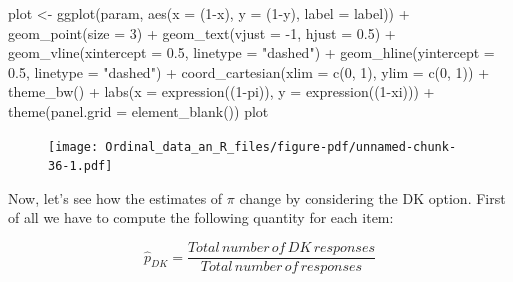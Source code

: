 \documentclass[
  letterpaper,
  DIV=11,
  numbers=noendperiod]{scrartcl}
\newenvironment{Shaded}{\begin{snugshade}}{\end{snugshade}}
\newcommand{\AttributeTok}[1]{\textcolor[rgb]{0.40,0.45,0.13}{#1}}
\newcommand{\DecValTok}[1]{\textcolor[rgb]{0.68,0.00,0.00}{#1}}
\newcommand{\FloatTok}[1]{\textcolor[rgb]{0.68,0.00,0.00}{#1}}
\newcommand{\FunctionTok}[1]{\textcolor[rgb]{0.28,0.35,0.67}{#1}}
\newcommand{\NormalTok}[1]{\textcolor[rgb]{0.00,0.23,0.31}{#1}}
\newcommand{\OtherTok}[1]{\textcolor[rgb]{0.00,0.23,0.31}{#1}}
\newcommand{\SpecialCharTok}[1]{\textcolor[rgb]{0.37,0.37,0.37}{#1}}
\newcommand{\StringTok}[1]{\textcolor[rgb]{0.13,0.47,0.30}{#1}}
\begin{document}
\begin{Shaded}
\begin{Highlighting}[]
\NormalTok{plot }\OtherTok{\textless{}{-}} \FunctionTok{ggplot}\NormalTok{(param, }\FunctionTok{aes}\NormalTok{(}\AttributeTok{x =}\NormalTok{ (}\DecValTok{1}\SpecialCharTok{{-}}\NormalTok{x), }\AttributeTok{y =}\NormalTok{ (}\DecValTok{1}\SpecialCharTok{{-}}\NormalTok{y), }\AttributeTok{label =}\NormalTok{ label)) }\SpecialCharTok{+}
  \FunctionTok{geom\_point}\NormalTok{(}\AttributeTok{size =} \DecValTok{3}\NormalTok{) }\SpecialCharTok{+}
  \FunctionTok{geom\_text}\NormalTok{(}\AttributeTok{vjust =} \SpecialCharTok{{-}}\DecValTok{1}\NormalTok{, }\AttributeTok{hjust =} \FloatTok{0.5}\NormalTok{) }\SpecialCharTok{+}
  \FunctionTok{geom\_vline}\NormalTok{(}\AttributeTok{xintercept =} \FloatTok{0.5}\NormalTok{, }\AttributeTok{linetype =} \StringTok{"dashed"}\NormalTok{) }\SpecialCharTok{+}
  \FunctionTok{geom\_hline}\NormalTok{(}\AttributeTok{yintercept =} \FloatTok{0.5}\NormalTok{, }\AttributeTok{linetype =} \StringTok{"dashed"}\NormalTok{) }\SpecialCharTok{+}
  \FunctionTok{coord\_cartesian}\NormalTok{(}\AttributeTok{xlim =} \FunctionTok{c}\NormalTok{(}\DecValTok{0}\NormalTok{, }\DecValTok{1}\NormalTok{), }\AttributeTok{ylim =} \FunctionTok{c}\NormalTok{(}\DecValTok{0}\NormalTok{, }\DecValTok{1}\NormalTok{)) }\SpecialCharTok{+}
  \FunctionTok{theme\_bw}\NormalTok{() }\SpecialCharTok{+}
  \FunctionTok{labs}\NormalTok{(}\AttributeTok{x =} \FunctionTok{expression}\NormalTok{((}\DecValTok{1}\SpecialCharTok{{-}}\NormalTok{pi)), }\AttributeTok{y =} \FunctionTok{expression}\NormalTok{((}\DecValTok{1}\SpecialCharTok{{-}}\NormalTok{xi))) }\SpecialCharTok{+}
  \FunctionTok{theme}\NormalTok{(}\AttributeTok{panel.grid =} \FunctionTok{element\_blank}\NormalTok{())}
\NormalTok{plot}
\end{Highlighting}
\end{Shaded}

\begin{figure}[H]

{\centering \texttt{[image: Ordinal\_data\_an\_R\_files/figure-pdf/unnamed-chunk-36-1.pdf]}

}

\end{figure}

Now, let's see how the estimates of \(\pi\) change by considering the DK
option. First of all we have to compute the following quantity for each
item:

\[
\hat{p}_{DK} = \frac{Total\, number\, of\, DK\, responses}{Total\, number\, of\, responses}
\]
\end{document}
